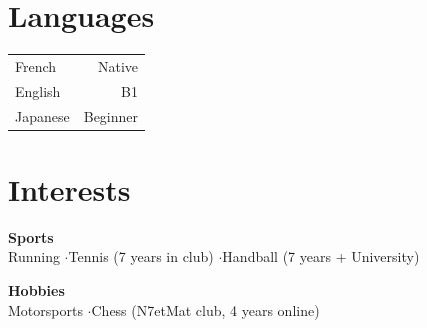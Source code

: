 \documentclass[a4paper,11pt]{article}
\begin{document}
\begin{minipage}[t]{0.48\linewidth}

\section{Languages}

\begin{tabularx}{\linewidth}{Xr}
  French  & Native \\
  English & B1 \\
  Japanese & Beginner \\
\end{tabularx}

\section{Interests}

\textbf{Sports}\\
Running \enspace$\cdot$\enspace Tennis (7 years in club) \enspace$\cdot$\enspace Handball (7 years + University)

\vspace{6pt}
\textbf{Hobbies}\\
Motorsports \enspace$\cdot$\enspace Chess (N7etMat club, 4 years online)

\end{minipage}
\end{document}
